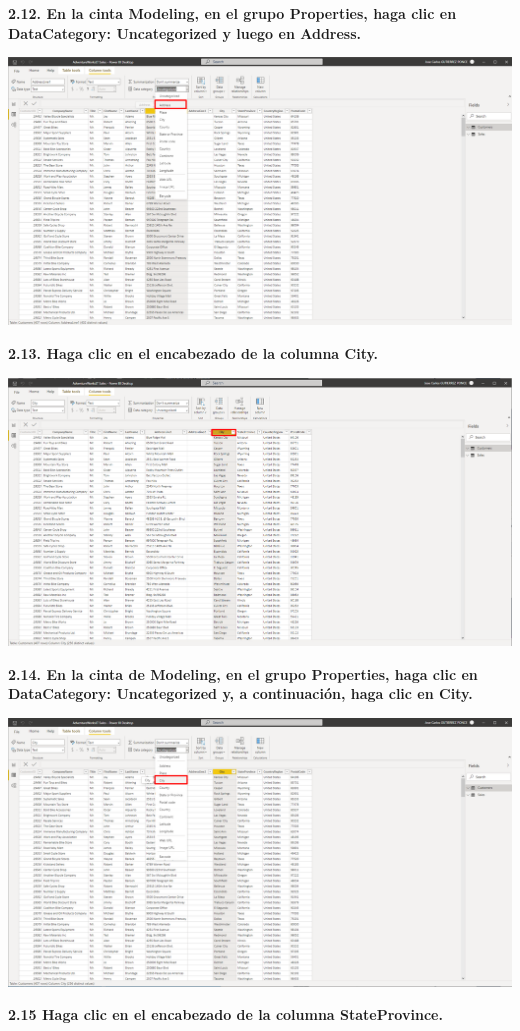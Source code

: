 \documentclass{article}
\begin{document}
\textbf{2.12. En la cinta \textbf{Modeling}, en el grupo \textbf{Properties}, haga clic en \textbf{DataCategory: Uncategorized} y luego en \textbf{Address}.}

    \begin{center}
		\includegraphics[width=14cm]{./images/25} 
	\end{center}
\newpage	
\textbf{2.13. Haga clic en el encabezado de la columna \textbf{City}.}

    \begin{center}
		\includegraphics[width=14cm]{./images/26} 
	\end{center}
	
\textbf{2.14. En la cinta de \textbf{Modeling}, en el grupo \textbf{Properties}, haga clic en \textbf{DataCategory: Uncategorized} y, a continuación, haga clic en \textbf{City}.}

    \begin{center}
		\includegraphics[width=14cm]{./images/27} 
	\end{center}
\newpage	
\textbf{2.15 Haga clic en el encabezado de la columna \textbf{StateProvince}.}
\end{document}
